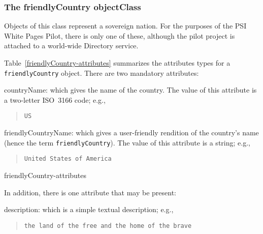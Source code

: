 \subsubsection	{The friendlyCountry objectClass}
Objects of this class represent a sovereign nation.
For the purposes of the PSI White Pages Pilot,
there is only one of these,
although the pilot project is attached to a world-wide Directory service.

Table~\ref{friendlyCountry-attributes} summarizes the attributes types for
a \verb"friendlyCountry" object.
There are two mandatory attributes:
\begin{describe}
\item[countryName:]
			which gives the name of the country.
			The value of this attribute is a two-letter ISO~3166
			code; e.g.,
\begin{quote}\small\begin{verbatim}
US
\end{verbatim}\end{quote}

\item[friendlyCountryName:]
			which gives a user-friendly rendition of the
			country's name (hence the term \verb"friendlyCountry").
			The value of this attribute is a string; e.g.,
\begin{quote}\small\begin{verbatim}
United States of America
\end{verbatim}\end{quote}
\end{describe}
%
	{friendlyCountry-attributes}

In addition,
there is one attribute that may be present:
\begin{describe}
\item[description:]
			which is a simple textual description;
			e.g.,
\begin{quote}\small\begin{verbatim}
the land of the free and the home of the brave
\end{verbatim}\end{quote}
\end{describe}

